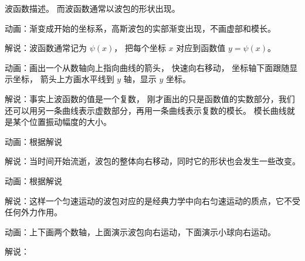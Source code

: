 波函数描述。 而波函数通常以波包的形状出现。

动画：渐变成开始的坐标系，高斯波包的实部渐变出现，不画虚部和模长。

解说：波函数通常记为 $\psi(x)$， 把每个坐标 $x$ 对应到函数值 $y = \psi(x)$。

动画：画出一个从数轴向上指向曲线的箭头， 快速向右移动， 坐标轴下面跟随显示坐标， 箭头上方画水平线到 $y$ 轴，显示 $y$ 坐标。

解说：事实上波函数的值是一个复数， 刚才画出的只是函数值的实数部分，我们还可以用另一条曲线表示虚数部分，再用一条曲线表示复数的模长。 模长曲线就是某个位置振动幅度的大小。

动画：根据解说

解说：当时间开始流逝，波包的整体向右移动，同时它的形状也会发生一些改变。

动画：根据解说

解说：这样一个匀速运动的波包对应的是经典力学中向右匀速运动的质点，它不受任何外力作用。

动画：上下画两个数轴，上面演示波包向右运动，下面演示小球向右运动。

解说：
